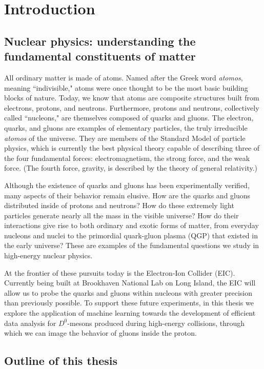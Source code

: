 \chapter{Introduction}
\section{Nuclear physics: understanding the fundamental constituents of matter}
All ordinary matter is made of atoms. Named after the Greek word {\it atomos}, meaning ``indivisible," atoms were once thought to be the most basic building blocks of nature. Today, we know that atoms are composite structures built from electrons, protons, and neutrons. Furthermore, protons and neutrons, collectively called ``nucleons," are themselves composed of quarks and gluons. The electron, quarks, and gluons are examples of elementary particles, the truly irreducible {\it atomos} of the universe. They are members of the Standard Model of particle physics, which is currently the best physical theory capable of describing three of the four fundamental forces: electromagnetism, the strong force, and the weak force. (The fourth force, gravity, is described by the theory of general relativity.) 

Although the existence of quarks and gluons has been experimentally verified, many aspects of their behavior remain elusive. How are the quarks and gluons distributed inside of protons and neutrons? How do these extremely light particles generate nearly all the mass in the visible universe? How do their interactions give rise to both ordinary and exotic forms of matter, from everyday nucleons and nuclei to the primordial quark-gluon plasma (QGP) that existed in the early universe? These are examples of the fundamental questions we study in high-energy nuclear physics.

At the frontier of these pursuits today is the Electron-Ion Collider (EIC). Currently being built at Brookhaven National Lab on Long Island, the EIC will allow us to probe the quarks and gluons within nucleons with greater precision than previously possible. To support these future experiments, in this thesis we explore the application of machine learning towards the development of efficient data analysis for $D^0$-mesons produced during high-energy collisions, through which we can image the behavior of gluons inside the proton.

\section{Outline of this thesis}


